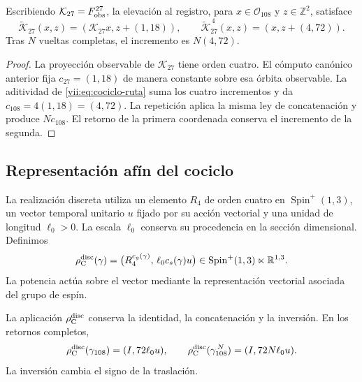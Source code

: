 \begin{proposition}
\label{vii:prop:memoria-vuelta-completa}
Escribiendo \(\mathcal K_{27}=F_{\rm obs}^{27}\), la elevación
al registro, para \(x\in\mathcal O_{108}\) y \(z\in\mathbb Z^2\), satisface
\[
 \widetilde{\mathcal K}_{27}(x,z)
   =(\mathcal K_{27}x,z+(1,18)),\qquad
 \widetilde{\mathcal K}_{27}^{\,4}(x,z)
   =(x,z+(4,72)).
\]
Tras \(N\) vueltas completas, el incremento es \(N(4,72)\).
\end{proposition}

\begin{proof}
La proyección observable de \(\mathcal K_{27}\) tiene orden cuatro.
El cómputo canónico anterior fija \(c_{27}=(1,18)\) de manera constante
sobre esa órbita observable. La aditividad de
\eqref{vii:eq:cociclo-ruta} suma los cuatro incrementos y da
\(c_{108}=4(1,18)=(4,72)\).
La repetición aplica la misma ley de concatenación y produce
\(Nc_{108}\). El retorno de la primera coordenada conserva el
incremento de la segunda.
\end{proof}

\subsection{Representación afín del cociclo}
\label{vii:subsec:representacion-afin-cociclo}

La realización discreta utiliza un elemento \(R_4\) de orden cuatro en
\(\operatorname{Spin}^+(1,3)\), un vector temporal unitario \(u\)
fijado por su acción vectorial y una unidad de longitud \(\ell_0>0\).
La escala \(\ell_0\) conserva su procedencia en la sección dimensional.
Definimos
\begin{equation}
 \rho_{\rm C}^{\rm disc}(\gamma)=
 \bigl(R_4^{c_g(\gamma)},\,\ell_0c_s(\gamma)u\bigr)
 \in\operatorname{Spin}^+(1,3)\ltimes\mathbb R^{1,3}.
 \label{vii:eq:representacion-discreta-memoria}
\end{equation}
La potencia actúa sobre el vector mediante la representación vectorial
asociada del grupo de espín.

\begin{theorem}
\label{vii:thm:traslacion-memoria}
La aplicación \(\rho_{\rm C}^{\rm disc}\) conserva la identidad,
la concatenación y la inversión. En los retornos completos,
\begin{equation}
 \rho_{\rm C}^{\rm disc}(\gamma_{108})=(I,72\ell_0u),\qquad
 \rho_{\rm C}^{\rm disc}(\gamma_{108}^{\,N})=(I,72N\ell_0u).
 \label{vii:eq:traslacion-retorno-108}
\end{equation}
La inversión cambia el signo de la traslación.
\end{theorem}

